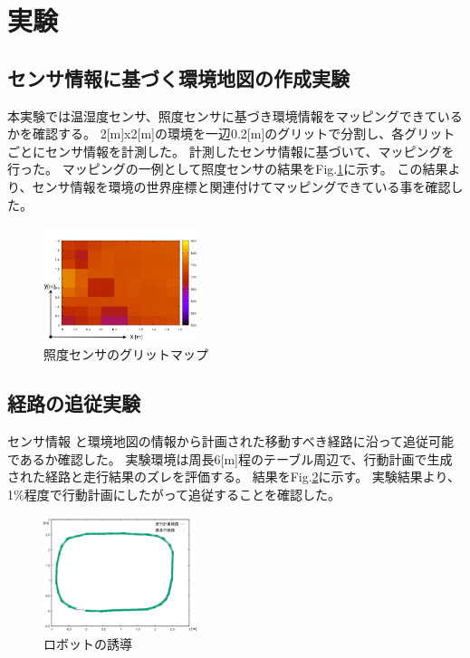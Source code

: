 \documentclass[10pt]{jsarticle}
\begin{document}
\section{実験}
\subsection{センサ情報に基づく環境地図の作成実験}
\label{sec_map}
本実験では温湿度センサ、照度センサに基づき環境情報をマッピングできているかを確認する。
2[m]x2[m]の環境を一辺0.2[m]のグリットで分割し、各グリットごとにセンサ情報を計測した。
計測したセンサ情報に基づいて、マッピングを行った。
マッピングの一例として照度センサの結果をFig.\ref{light_map}に示す。
この結果より、センサ情報を環境の世界座標と関連付けてマッピングできている事を確認した。
\begin{figure}[t]
    \centering
    \includegraphics[width=0.4\textwidth]{img/light_xya.png}
    \caption{照度センサのグリットマップ}
    \label{light_map}
\end{figure}
\subsection{経路の追従実験}
\label{sec_keiro}
センサ情報 と環境地図の情報から計画された移動すべき経路に沿って追従可能であるか確認した。
実験環境は周長6[m]程のテーブル周辺で、行動計画で生成された経路と走行結果のズレを評価する。
結果をFig.\ref{tsuizyu}に示す。
実験結果より、1\%程度で行動計画にしたがって追従することを確認した。
\begin{figure}[t]
    \centering
    \includegraphics[width=0.4\textwidth]{img/tsuizyua.png}
    \caption{ロボットの誘導}
    \label{tsuizyu}
\end{figure}
\end{document}
